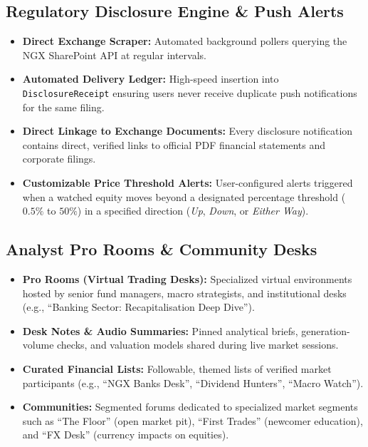 \documentclass[11pt,a4paper]{article}
\begin{document}
\subsection{Regulatory Disclosure Engine \& Push Alerts}
\begin{itemize}
    \item \textbf{Direct Exchange Scraper:} Automated background pollers querying the NGX SharePoint API at regular intervals.
    \item \textbf{Automated Delivery Ledger:} High-speed insertion into \texttt{DisclosureReceipt} ensuring users never receive duplicate push notifications for the same filing.
    \item \textbf{Direct Linkage to Exchange Documents:} Every disclosure notification contains direct, verified links to official PDF financial statements and corporate filings.
    \item \textbf{Customizable Price Threshold Alerts:} User-configured alerts triggered when a watched equity moves beyond a designated percentage threshold ($0.5\%$ to $50\%$) in a specified direction (\textit{Up}, \textit{Down}, or \textit{Either Way}).
\end{itemize}

\subsection{Analyst Pro Rooms \& Community Desks}
\begin{itemize}
    \item \textbf{Pro Rooms (Virtual Trading Desks):} Specialized virtual environments hosted by senior fund managers, macro strategists, and institutional desks (e.g., ``Banking Sector: Recapitalisation Deep Dive'').
    \item \textbf{Desk Notes \& Audio Summaries:} Pinned analytical briefs, generation-volume checks, and valuation models shared during live market sessions.
    \item \textbf{Curated Financial Lists:} Followable, themed lists of verified market participants (e.g., ``NGX Banks Desk'', ``Dividend Hunters'', ``Macro Watch'').
    \item \textbf{Communities:} Segmented forums dedicated to specialized market segments such as ``The Floor'' (open market pit), ``First Trades'' (newcomer education), and ``FX Desk'' (currency impacts on equities).
\end{itemize}
\end{document}
